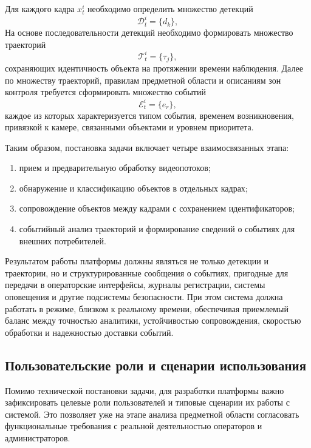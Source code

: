 Для каждого кадра $x_t^i$ необходимо определить множество детекций
\begin{equation}
\mathcal{D}_t^i = \{d_k\},
\end{equation}
\where
{}
На основе последовательности детекций необходимо формировать множество траекторий
\begin{equation}
\mathcal{T}_t^i = \{\tau_j\},
\end{equation}
сохраняющих идентичность объекта на протяжении времени наблюдения. Далее по множеству траекторий, правилам предметной области и описаниям зон контроля требуется сформировать множество событий
\begin{equation}
\mathcal{E}_t^i = \{e_r\},
\end{equation}
каждое из которых характеризуется типом события, временем возникновения, привязкой к камере, связанными объектами и уровнем приоритета.

Таким образом, постановка задачи включает четыре взаимосвязанных этапа:
\begin{enumerate}
    \item прием и предварительную обработку видеопотоков;
    \item обнаружение и классификацию объектов в отдельных кадрах;
    \item сопровождение объектов между кадрами с сохранением идентификаторов;
    \item событийный анализ траекторий и формирование сведений о событиях для внешних потребителей.
\end{enumerate}

Результатом работы платформы должны являться не только детекции и траектории, но и структурированные сообщения о событиях, пригодные для передачи в операторские интерфейсы, журналы регистрации, системы оповещения и другие подсистемы безопасности. При этом система должна работать в режиме, близком к реальному времени, обеспечивая приемлемый баланс между точностью аналитики, устойчивостью сопровождения, скоростью обработки и надежностью доставки событий.

\subsection{Пользовательские роли и сценарии использования}
\label{subsec:user_journey}

Помимо технической постановки задачи, для разработки платформы важно зафиксировать целевые роли пользователей и типовые сценарии их работы с системой. Это позволяет уже на этапе анализа предметной области согласовать функциональные требования с реальной деятельностью операторов и администраторов.

